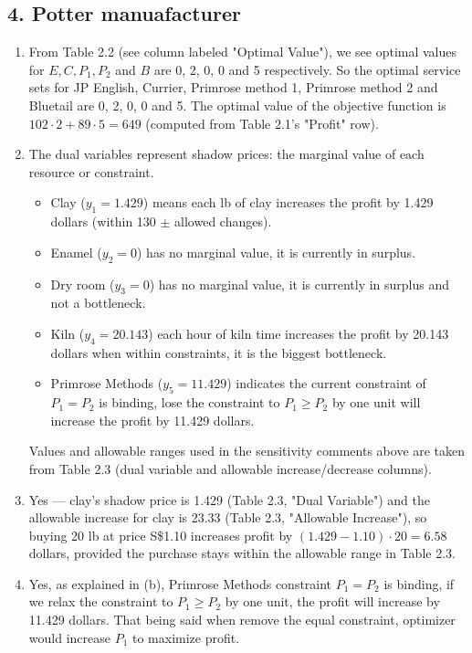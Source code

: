 \documentclass[12pt]{article}
\begin{document}
\subsection*{4. Potter manuafacturer}
\begin{enumerate}[label= (\alph*), leftmargin=2em]
\item From Table 2.2 (see column labeled "Optimal Value"), we see optimal values for $E, C, P_1, P_2$ and $B$ are 0, 2, 0, 0 and 5 respectively. So the optimal service sets for JP English, Currier, Primrose method 1, Primrose method 2 and Bluetail are 0, 2, 0, 0 and 5. The optimal value of the objective function is $102\cdot2 + 89\cdot5 = 649$ (computed from Table 2.1's "Profit" row).
\item The dual variables represent shadow prices: the marginal value of each resource or constraint. 
\begin{itemize}
\item Clay ($y_1=1.429$) means each lb of clay increases the profit by 1.429 dollars (within 130 $\pm$ allowed changes).
\item Enamel ($y_2=0$) has no marginal value, it is currently in surplus.
\item Dry room ($y_3=0$) has no marginal value, it is currently in surplus and not a bottleneck.
\item Kiln ($y_4=20.143$) each hour of kiln time increases the profit by 20.143 dollars when within constraints, it is the biggest bottleneck.
\item Primrose Methods ($y_5=11.429$) indicates the current constraint of $P_1 = P_2$ is binding, lose the constraint to $P_1 \geq P_2 $ by one unit will increase the profit by 11.429 dollars.
\end{itemize}

Values and allowable ranges used in the sensitivity comments above are taken from Table 2.3 (dual variable and allowable increase/decrease columns).

\item Yes — clay's shadow price is 1.429 (Table 2.3, "Dual Variable") and the allowable increase for clay is 23.33 (Table 2.3, "Allowable Increase"), so buying 20 lb at price S\$1.10 increases profit by $(1.429-1.10)\cdot20 = 6.58$ dollars, provided the purchase stays within the allowable range in Table 2.3.

\item Yes, as explained in (b), Primrose Methods constraint $P_1 = P_2$ is binding, if we relax the constraint to $P_1 \geq P_2$ by one unit, the profit will increase by 11.429 dollars. That being said when remove the equal constraint, optimizer would increase $P_1$ to maximize profit.
\end{enumerate}
\end{document}
